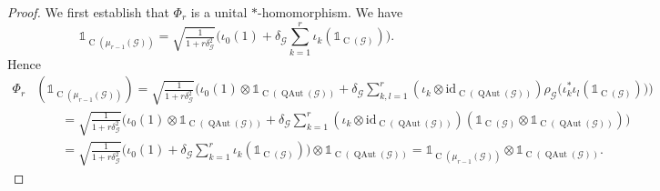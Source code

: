 \documentclass[11pt,reqno]{amsart}
\newcommand{\id}{\mathrm{id}}
\newcommand{\I}{\mathds{1}}
\newcommand{\tens}{\otimes}
\DeclareMathOperator{\QAut}{QAut}
\DeclareMathOperator{\C}{C}
\begin{document}
\begin{proof}
We first establish that $\Phi_r$ is a unital $*$-homomorphism. We have
\[
\I_{\C(\mu_{r-1}(\mathcal{G}))}=\sqrt{\tfrac{1}{1+r\delta_{\scriptscriptstyle\mathcal{G}}^2}}\biggl(\iota_0(1)+\delta_{\scriptscriptstyle\mathcal{G}}\sum_{k=1}^r\iota_k(\I_{\C(\mathcal{G})})\biggr).
\]
Hence
\begin{align*}
\Phi_r&(\I_{\C(\mu_{r-1}(\mathcal{G}))})=\sqrt{\tfrac{1}{1+r\delta_{\scriptscriptstyle\mathcal{G}}^2}}\biggl(\iota_0(1)\tens\I_{\C(\QAut(\mathcal{G}))}+\delta_{\scriptscriptstyle\mathcal{G}}\sum_{k,l=1}^r(\iota_k\tens\id_{\C(\QAut(\mathcal{G}))})\rho_{\scriptscriptstyle\mathcal{G}}\bigl(\iota_k^*\iota_l(\I_{\C(\mathcal{G})})\bigr)\biggr)\\
&\qquad=\sqrt{\tfrac{1}{1+r\delta_{\scriptscriptstyle\mathcal{G}}^2}}\biggl(\iota_0(1)\tens\I_{\C(\QAut(\mathcal{G}))}+\delta_{\scriptscriptstyle\mathcal{G}}\sum_{k=1}^r(\iota_k\tens\id_{\C(\QAut(\mathcal{G}))})(\I_{\C(\mathcal{G})}\tens\I_{\C(\QAut(\mathcal{G}))})\biggr)\\
&\qquad=\sqrt{\tfrac{1}{1+r\delta_{\scriptscriptstyle\mathcal{G}}^2}}\biggl(\iota_0(1)+\delta_{\scriptscriptstyle\mathcal{G}}\sum_{k=1}^r\iota_k(\I_{\C(\mathcal{G})})\biggr)\tens\I_{\C(\QAut(\mathcal{G}))}=\I_{\C(\mu_{r-1}(\mathcal{G}))}\tens\I_{\C(\QAut(\mathcal{G}))}.
\end{align*}


\end{proof}
\end{document}
